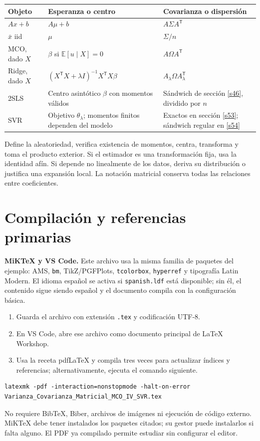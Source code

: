 \documentclass[11pt,a4paper]{article}
\newcommand{\E}{\mathbb E}
\newcommand{\T}{^{\mathsf T}}
\theoremstyle{definition}\newtheorem{definicion}[teorema]{Definición}
\begin{document}
\begin{center}\small
\begin{tabular}{@{}p{3.1cm}p{7.2cm}p{5cm}@{}}
\toprule
Objeto & Esperanza o centro & Covarianza o dispersión\\
\midrule
$Ax+b$ & $A\mu+b$ & $A\Sigma A\T$\\[4pt]
$\bar x$ iid & $\mu$ & $\Sigma/n$\\[4pt]
MCO, dado $X$ & $\beta$ si $\E[u\mid X]=0$ & $A\Omega A\T$\\[4pt]
Ridge, dado $X$ & $(X\T X+\lambda I)^{-1}X\T X\beta$ & $A_\lambda\Omega A_\lambda\T$\\[4pt]
2SLS & Centro asintótico $\beta$ con momentos válidos & Sándwich de sección \ref{s46}, dividido por $n$\\[4pt]
SVR & Objetivo $\theta_\lambda$; momentos finitos dependen del modelo & Exactos en sección \ref{s53}; sándwich regular en \ref{s54}\\
\bottomrule
\end{tabular}
\end{center}
\begin{idea}
Define la aleatoriedad, verifica existencia de momentos, centra, transforma
y toma el producto exterior. Si el estimador es una transformación fija,
usa la identidad afín. Si depende no linealmente de los datos,
deriva su distribución o justifica una expansión local.
La notación matricial conserva todas las relaciones entre coeficientes.
\end{idea}

\clearpage
\section*{Compilación y referencias primarias}
\label{referencias}
\textbf{MiKTeX y VS Code.}
Este archivo usa la misma familia de paquetes del ejemplo: AMS,
\texttt{bm}, TikZ/PGFPlots, \texttt{tcolorbox}, \texttt{hyperref} y
tipografía Latin Modern. El idioma español se activa si
\texttt{spanish.ldf} está disponible; sin él, el contenido sigue siendo español
y el documento compila con la configuración básica.

\begin{enumerate}
\item Guarda el archivo con extensión \texttt{.tex} y codificación UTF-8.
\item En VS Code, abre ese archivo como documento principal de LaTeX Workshop.
\item Usa la receta pdfLaTeX y compila tres veces para actualizar índices
y referencias; alternativamente, ejecuta el comando siguiente.
\end{enumerate}
\begin{lstlisting}
latexmk -pdf -interaction=nonstopmode -halt-on-error Varianza_Covarianza_Matricial_MCO_IV_SVR.tex
\end{lstlisting}
No requiere Bib\TeX{}, Biber, archivos de imágenes ni ejecución de código
externo. MiKTeX debe tener instalados los paquetes citados; su gestor puede
instalarlos si falta alguno. El PDF ya compilado permite estudiar
sin configurar el editor.
\end{document}
